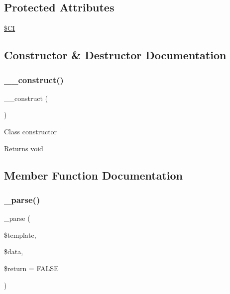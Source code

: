 \subsection*{Protected Attributes}
\begin{DoxyCompactItemize}
\item 
\mbox{\hyperlink{class_c_i___parser_ae0314d046ddf7fcfaec03222977427d3}{\$\+CI}}
\end{DoxyCompactItemize}


\subsection{Constructor \& Destructor Documentation}
\mbox{\label{class_c_i___parser_a095c5d389db211932136b53f25f39685}} 
\subsubsection{\texorpdfstring{\+\_\+\+\_\+construct()}{\_\_construct()}}
{\footnotesize\ttfamily \+\_\+\+\_\+construct (\begin{DoxyParamCaption}{ }\end{DoxyParamCaption})}

Class constructor

\begin{DoxyReturn}{Returns}
void 
\end{DoxyReturn}


\subsection{Member Function Documentation}
\mbox{\label{class_c_i___parser_a6bd5ad826db82a61de1f3a13031faaf9}} 
\subsubsection{\texorpdfstring{\+\_\+parse()}{\_parse()}}
{\footnotesize\ttfamily \+\_\+parse (\begin{DoxyParamCaption}\item[{}]{\$template,  }\item[{}]{\$data,  }\item[{}]{\$return = {\ttfamily FALSE} }\end{DoxyParamCaption})\hspace{0.3cm}{\ttfamily [protected]}}

